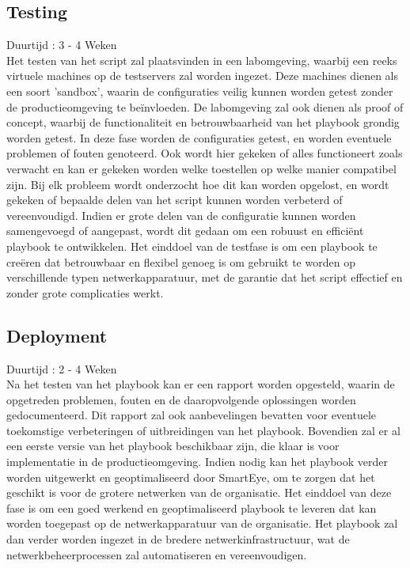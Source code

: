 \subsection{Testing}
\label{sec:testing}
{\small Duurtijd : 3 - 4 Weken}\\

Het testen van het script zal plaatsvinden in een labomgeving, waarbij een reeks virtuele machines op de testservers zal worden ingezet. 
Deze machines dienen als een soort 'sandbox', waarin de configuraties veilig kunnen worden getest zonder de productieomgeving te beïnvloeden. 
De labomgeving zal ook dienen als proof of concept, waarbij de functionaliteit en betrouwbaarheid van het playbook grondig worden getest.
In deze fase worden de configuraties getest, en worden eventuele problemen of fouten genoteerd. 
Ook wordt hier gekeken of alles functioneert zoals verwacht en kan er gekeken worden welke toestellen op welke manier compatibel zijn. 
Bij elk probleem wordt onderzocht hoe dit kan worden opgelost, en wordt gekeken of bepaalde delen van het script kunnen worden verbeterd of vereenvoudigd. 
Indien er grote delen van de configuratie kunnen worden samengevoegd of aangepast, wordt dit gedaan om een robuust en efficiënt playbook te ontwikkelen.
Het einddoel van de testfase is om een playbook te creëren dat betrouwbaar en flexibel genoeg is om gebruikt te worden op verschillende typen netwerkapparatuur, 
met de garantie dat het script effectief en zonder grote complicaties werkt.

\subsection{Deployment}
\label{sec:deployment}
{\small Duurtijd : 2 - 4 Weken}\\

Na het testen van het playbook kan er een rapport worden opgesteld, waarin de opgetreden problemen, fouten en de daaropvolgende oplossingen worden gedocumenteerd. 
Dit rapport zal ook aanbevelingen bevatten voor eventuele toekomstige verbeteringen of uitbreidingen van het playbook. 
Bovendien zal er al een eerste versie van het playbook beschikbaar zijn, die klaar is voor implementatie in de productieomgeving.
Indien nodig kan het playbook verder worden uitgewerkt en geoptimaliseerd door SmartEye, om te zorgen dat het geschikt is voor de grotere netwerken van de organisatie. 
Het einddoel van deze fase is om een goed werkend en geoptimaliseerd playbook te leveren dat kan worden toegepast op de netwerkapparatuur van de organisatie. 
Het playbook zal dan verder worden ingezet in de bredere netwerkinfrastructuur, wat de netwerkbeheerprocessen zal automatiseren en vereenvoudigen.

